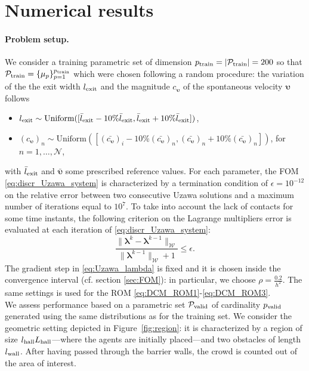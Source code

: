  \section{Numerical results}
\label{sec:num_res}
\paragraph{Problem setup.}
We consider a training parametric set of dimension $p_{\rm train}= |\mathcal P_{\rm train}|= 200$
 so that $\mathcal P_{\rm train} = \{\mu_p\}_{p=1}^{p_{\rm train}}$ which were chosen following a random procedure: the variation of the  the exit width $l_{\rm exit}$ and the magnitude  $c_{\boldsymbol{\upsilon}}$ of the  spontaneous velocity $\boldsymbol{\upsilon}$ follows
\begin{itemize}
\item $l_{\rm exit} \sim \text{Uniform}([\bar{l}_{\rm exit}-10\%\bar{l}_{\rm exit},\bar{l}_{\rm exit}+10\%\bar{l}_{\rm exit}])$,
\item $(c_{\boldsymbol{\upsilon}})_n \sim \text{Uniform}([(\bar{c_{\boldsymbol{\upsilon}}})_i-10\%(\bar{c_{\boldsymbol{\upsilon}}})_n,(\bar{c_{\boldsymbol{\upsilon}}})_n+10\%(\bar{c_{\boldsymbol{\upsilon}}})_n])$, for $n=1, \ldots, \mathcal N$,
\end{itemize}
 with $\bar{l}_{\rm exit}$ and $\bar{\boldsymbol{\upsilon}}$ some  prescribed reference values.
For each parameter, the FOM \eqref{eq:discr_Uzawa_system} is characterized by a termination condition of $\epsilon=10^{-12}$ on the relative error between two consecutive Uzawa solutions and a maximum number of iterations equal to $10^{7}$. To take into account the lack of contacts for some time instants, the following criterion on the Lagrange multipliers error is evaluated at each iteration of \eqref{eq:discr_Uzawa_system}:
$$\frac{\|\boldsymbol{\lambda}^{k}-\boldsymbol{\lambda}^{k-1}\|_{\mathcal W}}{\|\boldsymbol{\lambda}^{k-1}\|_{\mathcal W}+1}\leq \epsilon.$$
The gradient step in \eqref{eq:Uzawa_lambda} is fixed and it is chosen inside the convergence interval (cf. section \ref{sec:FOM}): in particular, we choose $\rho=\frac{0.2}{h^2}$.
The same settings is used for the ROM \eqref{eq:DCM_ROM1}-\eqref{eq:DCM_ROM3}. \\
We assess performance based on a parametric set $\mathcal P_{\rm valid}$ of cardinality $p_{\rm valid}$ generated using the same distributions as for the training set. We consider the geometric setting depicted in Figure~\ref{fig:region}: it is characterized by a region of size $l_{\rm hall}L_{\rm hall}$---where the agents are initially placed---and two obstacles of length $l_{\rm wall}$. After having passed through the barrier walls, the crowd is counted out of the area of interest.

